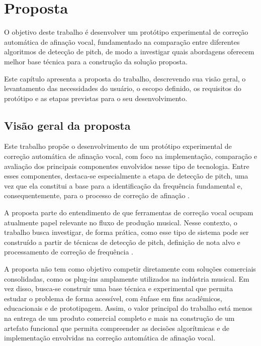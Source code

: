\chapter{\label{chap:proposta}Proposta}

O objetivo deste trabalho é desenvolver um protótipo experimental de correção automática de afinação vocal, fundamentado na comparação entre diferentes algoritmos de detecção de pitch, de modo a investigar quais abordagens oferecem melhor base técnica para a construção da solução proposta.

Este capítulo apresenta a proposta do trabalho, descrevendo sua visão geral, o levantamento das necessidades do usuário, o escopo definido, os requisitos do protótipo e as etapas previstas para o seu desenvolvimento.

\section{Visão geral da proposta}

Este trabalho propõe o desenvolvimento de um protótipo experimental de correção automática de afinação vocal, com foco na implementação, comparação e avaliação dos principais componentes envolvidos nesse tipo de tecnologia. Entre esses componentes, destaca-se especialmente a etapa de detecção de pitch, uma vez que ela constitui a base para a identificação da frequência fundamental e, consequentemente, para o processo de correção de afinação \cite{aalto_f0}.

A proposta parte do entendimento de que ferramentas de correção vocal ocupam atualmente papel relevante no fluxo de produção musical. Nesse contexto, o trabalho busca investigar, de forma prática, como esse tipo de sistema pode ser construído a partir de técnicas de detecção de pitch, definição de nota alvo e processamento de correção de frequência \cite{antares_autotune_pro, ableton_manual}. 

A proposta não tem como objetivo competir diretamente com soluções comerciais consolidadas, como os plug-ins amplamente utilizados na indústria musical. Em vez disso, busca-se construir uma base técnica e experimental que permita estudar o problema de forma acessível, com ênfase em fins acadêmicos, educacionais e de prototipagem. Assim, o valor principal do trabalho está menos na entrega de um produto comercial completo e mais na construção de um artefato funcional que permita compreender as decisões algorítmicas e de implementação envolvidas na correção automática de afinação vocal.

